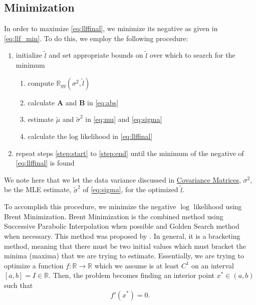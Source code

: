 \documentclass[12pt]{article}
\begin{document}
\subsection*{Minimization}
\label{sec:minimization}

In order to maximize \eqref{eq:llffinal}, we minimize its negative as given in \eqref{eq:llf_min}.
To do this, we employ the following procedure:
\begin{enumerate}
	\item initialize $\tilde{l}$ and set appropriate bounds on $\tilde{l}$ over which to search for the minimum
	\begin{enumerate}
		\item compute $\mathbb{R}_{yy}(\sigma^{2}, \tilde{l})$ \label{step:start}
		\item calculate $\bm{A}$ and $\bm{B}$ in \eqref{eq:abs}
		\item estimate $\tilde{\mu}$ and $\tilde{\sigma}^{2}$ in \eqref{eq:mu} and \eqref{eq:sigma}
		\item calculate the $\textrm{log}$ likelihood in \eqref{eq:llffinal} \label{step:end}
	\end{enumerate}
	\item repeat steps \ref{step:start} to \ref{step:end} until the minimum of the negative of \eqref{eq:llffinal} is found
\end{enumerate}
We note here that we let the data variance discussed in \hyperref[sec:covariance]{Covariance Matrices}, $\sigma^{2}$, be the MLE estimate, $\tilde{\sigma}^{2}$ of \eqref{eq:sigma}, for the optimized $\tilde{l}$.
\par
To accomplish this procedure, we minimize the negative $\log$ likelihood using Brent Minimization. 
Brent Minimization is the combined method using Successive Parabolic Interpolation when possible and Golden Search method when necessary. 
This method was proposed by \cite{brent1973}. 
In general, it is a bracketing method, meaning that there must be two initial values which must bracket the minima (maxima) that we are trying to estimate. 
Essentially, we are trying to optimize a function $f: \mathbb{R} \rightarrow \mathbb{R}$ which we assume is at least $C^1$ on an interval $[a, b] = I \in \mathbb{R}$. 
Then, the problem becomes finding an interior point $x^\ast \in (a, b)$ such that 
\begin{equation*}
    f'(x^\ast) = 0.
\end{equation*}

\clearpage
\printbibliography



\end{document}
